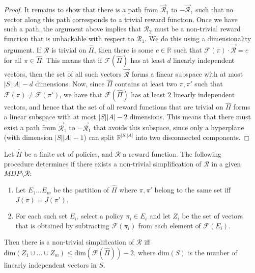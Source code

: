 \begin{proof}
It remains to show that there is a path from $\vec{\mathcal{R}}_1$ to $-\vec{\mathcal{R}}_1$ such that no vector along this path corresponds to a trivial reward function. 
Once we have such a path, the argument above implies that $\mathcal{R}_2$ must be a non-trivial reward function that is unhackable with respect to $\mathcal{R}_1$.
We do this using a dimensionality argument.
If $\mathcal{R}$ is trivial on $\hat{\Pi}$, then there is some $c \in \mathbb{R}$ such that $\mathcal{F}(\pi)\cdot\vec{\mathcal{R}} = c$ for all $\pi \in \hat{\Pi}$. This means that if $\mathcal{F}(\hat{\Pi})$ has at least $d$ linearly independent vectors, then the set of all such vectors $\vec{\mathcal{R}}$ forms a linear subspace with at most $|S||A| - d$ dimensions.
Now, since $\hat{\Pi}$ contains at least two $\pi,\pi'$ such that $\mathcal{F}(\pi) \neq \mathcal{F}(\pi')$, we have that $\mathcal{F}(\hat{\Pi})$ has at least $2$ linearly independent vectors, and hence that the set of all reward functions that are trivial on $\hat{\Pi}$ forms a linear subspace with at most $|S||A| - 2$ dimensions.
This means that there must exist a path from $\vec{\mathcal{R}}_1$ to $-\vec{\mathcal{R}}_1$ that avoids this subspace, 
since only a hyperplane (with dimension $|S||A| - 1$) can split $\mathbb{R}^{|S||A|}$ into two disconnected components.
\end{proof}


\begin{theorem}%
Let $\hat{\Pi}$ be a finite set of policies, and $\mathcal{R}$ a reward function. The following procedure determines if there exists a non-trivial simplification of $\mathcal{R}$ in a given $MDP \setminus \mathcal{R}$:
\begin{enumerate}
    \item Let $E_1 \dots E_m$ be the partition of $\hat{\Pi}$ where $\pi,\pi'$ belong to the same set iff $J(\pi) = J(\pi')$.
    \item For each such set $E_i$, select a policy $\pi_i \in E_i$ and let $Z_i$ be the set of vectors that is obtained by subtracting $\mathcal{F}(\pi_i)$ from each element of $\mathcal{F}(E_i)$.
\end{enumerate}
Then there is a non-trivial simplification of $\mathcal{R}$ iff $\mathrm{dim}(Z_1 \cup \dots \cup Z_m) \leq \mathrm{dim}(\mathcal{F}(\hat{\Pi})) - 2$, where $\mathrm{dim}(S)$ is the number of linearly independent vectors in $S$.
\end{theorem}

